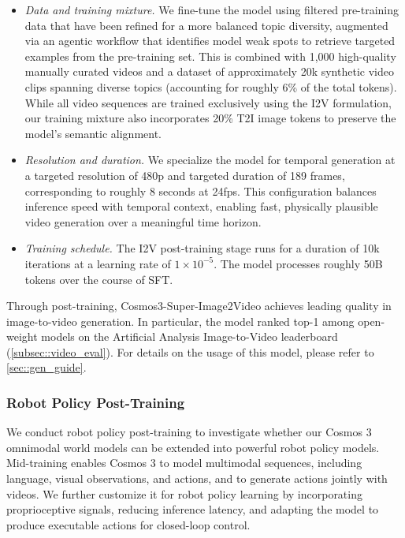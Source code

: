 \begin{itemize}
    \item \textit{Data and training mixture.} We fine-tune the model using filtered pre-training data that have been refined for a more balanced topic diversity, augmented via an agentic workflow that identifies model weak spots to retrieve targeted examples from the pre-training set. This is combined with 1,000 high-quality manually curated videos and a dataset of approximately 20k synthetic video clips spanning diverse topics (accounting for roughly 6\% of the total tokens). While all video sequences are trained exclusively using the I2V formulation, our training mixture also incorporates 20\% T2I image tokens to preserve the model's semantic alignment.

    \item \textit{Resolution and duration.} We specialize the model for temporal generation at a targeted resolution of 480p and targeted duration of 189 frames, corresponding to roughly 8 seconds at 24fps. This configuration balances inference speed with temporal context, enabling fast, physically plausible video generation over a meaningful time horizon.

    \item \textit{Training schedule.} The I2V post-training stage runs for a duration of 10k iterations at a learning rate of $1\times10^{-5}$. The model processes roughly 50B tokens over the course of SFT.
\end{itemize}

Through post-training, Cosmos3-Super-Image2Video achieves leading quality in image-to-video generation. In particular, the model ranked top-1 among open-weight models on the Artificial Analysis Image-to-Video leaderboard (\cref{subsec::video_eval}). For details on the usage of this model, please refer to \cref{sec::gen_guide}.


\subsubsection{Robot Policy Post-Training}
\label{sec::robot_policy_post_train}

We conduct robot policy post-training to investigate whether our Cosmos 3 omnimodal world models can be extended into powerful robot policy models. Mid-training enables Cosmos 3 to model multimodal sequences, including language, visual observations, and actions, and to generate actions jointly with videos. We further customize it for robot policy learning by incorporating proprioceptive signals, reducing inference latency, and adapting the model to produce executable actions for closed-loop control.

